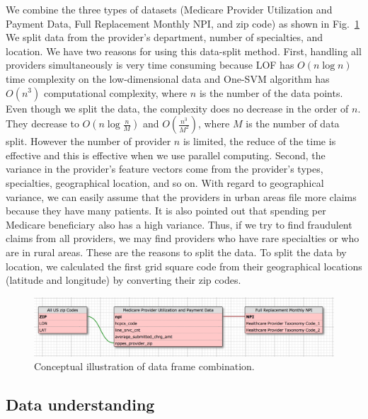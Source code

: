 \documentclass[dvipdfmx, english]{ampmt}             %
\newcommand{\Figref}[1]{Fig.~\ref{#1}}
\begin{document}
We combine the three types of datasets (Medicare Provider Utilization and Payment Data, Full Replacement Monthly NPI, and zip code) as shown in \Figref{fig:datacomb}
We split data from the provider’s{} department, number of specialties, and location. We have two reasons for using this data-split method. First, handling all providers simultaneously is very time consuming because LOF has $O(n\log n)$ time complexity
on the low\--dimensional data and One-SVM algorithm has $O(n^3)$ computational complexity, where $n$ is the number of the data points. Even though we split the data, the complexity does no decrease in the order of $n$. They decrease to $O(n\log{\frac{n}{M}})$ and $O(\frac{n^{3}}{M^{2}})$, where $M$ is the number of data split. However the number of provider $n$ is limited, the reduce of the time is effective and this is effective when we use parallel computing. 
Second, the variance in the provider’s {} feature vectors come from the provider's {} types, specialties, geographical location, and so on. With regard to geographical variance, we can easily assume that the providers in urban areas file more claims because they have many patients. It is also pointed out that spending per Medicare beneficiary also has a high variance\cite{GeoHealth}. Thus, if we try to find fraudulent claims from all providers, we may find providers who have rare specialties or who are in rural areas. These are the reasons to split the data. To split the data by location, we calculated the first grid square code \cite{ASatoMesh} from their geographical locations (latitude and longitude) by converting their zip codes.

\begin{figure}[H]
\centerline{\includegraphics[scale=.8]{../img/datacomb.png}}
\caption{Conceptual illustration of data frame combination.}
\label{fig:datacomb}
\end{figure}

\subsection{Data understanding}\label{sec:data-undestanding}
\end{document}
